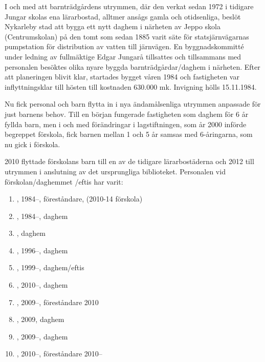 
I och med att barnträdgårdens utrymmen, där den verkat sedan 1972 i tidigare Jungar skolas ena lärarbostad, alltmer ansågs gamla och otidsenliga, beslöt Nykarleby stad att bygga ett nytt daghem i närheten av Jeppo skola (Centrumskolan) på den tomt som sedan 1885 varit säte för statsjärnvägarnas pumpstation för distribution av vatten till järnvägen. En byggnadskommitté under ledning av fullmäktige Edgar Jungarå tillsattes och tillsammans med personalen besöktes olika nyare byggda barnträdgårdar/daghem i närheten. Efter att planeringen  blivit klar, startades bygget våren 1984 och fastigheten var inflyttningsklar till hösten till kostnaden 630.000 mk. Invigning hölls 15.11.1984.

Nu fick personal och barn flytta in i nya ändamålsenliga utrymmen anpassade för just barnens behov. Till en början fungerade fastigheten  som daghem för 6 år fyllda barn, men i och med förändringar i lagstiftningen, som år 2000 införde begreppet förskola, fick barnen mellan 1 och 5 år samsas med 6-åringarna, som nu gick i förskola.

2010 flyttade förskolans barn till en av de tidigare lärarbostäderna och 2012 till utrymmen i anslutning av det ursprungliga biblioteket. Personalen vid förskolan/daghemmet /eftis har varit:
\begin{enumerate}
  \item {}, 1984--, föreståndare, (2010-14 förskola)
  \item {}, 1984--, daghem
  \item {}, daghem
  \item {}, 1996--, daghem
  \item {}, 1999--, daghem/eftis
  \item {}, 2010--, daghem
  \item {}, 2009--, föreståndare 2010
  \item {}, 2009, daghem
  \item {}, 2009--, daghem
  \item {}, 2010--, föreståndare 2010--
\end{enumerate}



